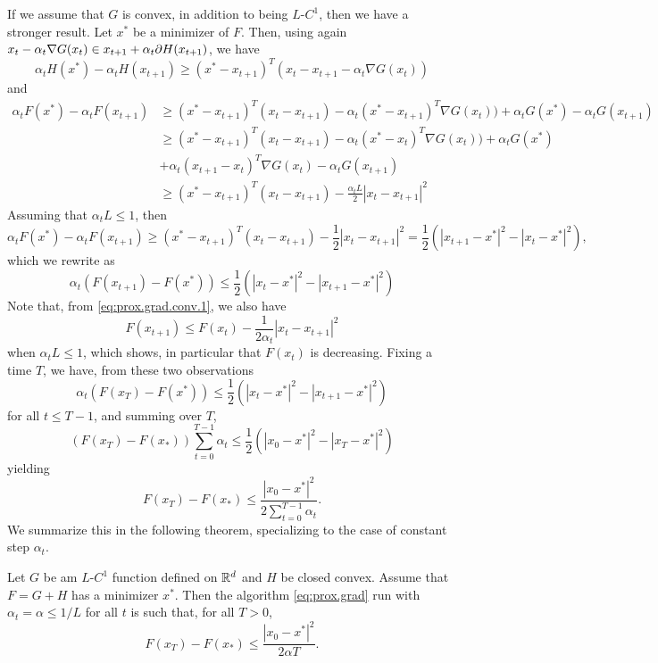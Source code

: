 If we assume that $G$ is convex, in addition to being $L$-$C^1$, then we have a stronger result.
Let $x^*$ be a minimizer of $F$. Then, using again $x_{t} - \alpha_t \nabla G(x_t) \in x_{t+1} + \alpha_t \partial H(x_{t+1})$, we have
\[
\alpha_t H(x^*) - \alpha_t H(x_{t+1}) \geq (x^* - x_{t+1} )^T (x_{t} - x_{t+1} - \alpha_t \nabla G(x_t)) 
\]
and
\begin{align*}
\alpha_t F(x^*) - \alpha_t F(x_{t+1}) &\geq (x^* - x_{t+1} )^T (x_{t} - x_{t+1}) - \alpha_t (x^* - x_{t+1} )^T \nabla G(x_t)) + \alpha_t G(x^*) - \alpha_t G(x_{t+1})   
\\
&\geq (x^* - x_{t+1} )^T (x_{t} - x_{t+1}) - \alpha_t (x^* - x_{t} )^T \nabla G(x_t)) + \alpha_t G(x^*)\\
& + \alpha_t (x_{t+1}-x_t)^T \nabla G(x_{t}) - \alpha_t G(x_{t+1})\\
& \geq   (x^* - x_{t+1} )^T (x_{t} - x_{t+1}) - \frac{\alpha_tL}{2} |x_t - x_{t+1}|^2
\end{align*}
Assuming that $\alpha_t L \leq 1$, then
\[
\alpha_t F(x^*) - \alpha_t F(x_{t+1}) \geq (x^* - x_{t+1} )^T (x_{t} - x_{t+1}) - \frac{1}{2} |x_t - x_{t+1}|^2 = \frac12 (|x_{t+1} - x^*|^2 - |x_t - x^*|^2), 
\]
which we rewrite as
\[
\alpha_t (F(x_{t+1}) - F(x^*)) \leq \frac12 (|x_{t} - x^*|^2 - |x_{t+1} - x^*|^2)
\]
Note that, from \cref{eq:prox.grad.conv.1}, we also have
\[
F(x_{t+1}) \leq F(x_t) - \frac{1}{2\alpha_t}|x_t -x_{t+1}|^2
\]
when $\alpha_t L \leq 1$, which shows, in particular that $F(x_t)$ is decreasing. Fixing a time $T$, we have, from these two observations
\[
\alpha_t (F(x_{T}) - F(x^*)) \leq \frac12 (|x_{t} - x^*|^2 - |x_{t+1} - x^*|^2)
\]
for all $t \leq T-1$, and summing over $T$, 
\[
(F(x_T) - F(x_*)) \sum_{t=0}^{T-1} \alpha_t \leq \frac12 (|x_{0} - x^*|^2 - |x_{T} - x^*|^2)
\]
yielding
\begin{equation}
\label{eq:prox.conv.2.0}
F(x_T) - F(x_*) \leq \frac{|x_0 -x^*|^2}{2\sum_{t=0}^{T-1} \alpha_t}.
\end{equation}
We summarize this in the following theorem, specializing to the case of constant step $\alpha_t$.
\begin{theorem}
\label{th:proximal.convergence}
Let $G$ be am $L$-$C^1$ function defined on ${\mathbb{R}}^d$ and $H$ be closed convex. Assume that $F = G+H$ has a minimizer $x^*$. Then the algorithm \cref{eq:prox.grad} run with $\alpha_t = \alpha \leq 1/L$ for all $t$ is such that, for all $T>0$,  
\begin{equation}
\label{eq:prox.conv.2}
F(x_T) - F(x_*) \leq \frac{|x_0 -x^*|^2}{2\alpha T}.
\end{equation}
\end{theorem}

